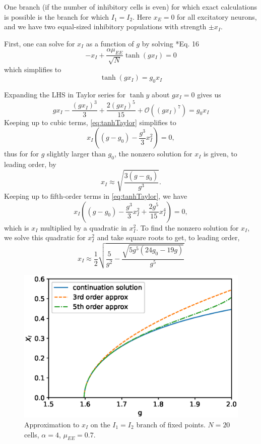 \documentclass[11pt,reqno]{amsart}
\begin{document}
One branch (if the number of inhibitory cells is even) for which exact calculations is possible is the branch for which $I_1=I_2$. Here $x_E = 0$ for all excitatory neurons, and we have two equal-sized inhibitory populations with strength $\pm x_I$. 

First, one can solve for $x_I$ as a function of $g$ by solving \cite{Barreiro2017}*{Eq. 16}
\[
-x_I + \frac{\alpha \mu_{EE} }{\sqrt{N}} \tanh(g x_I) = 0
\]
which simplifies to
\[
\tanh(g x_I) = g_0 x_I
\]

Expanding the LHS in Taylor series for $\tanh y$ about $gx_I = 0$ gives us 
\begin{equation}\label{eq:tanhTaylor}
g x_I - \frac{(g x_I)^3}{3} + \frac{2(g x_I)^5}{15} + \mathcal{O}\left( (g x_I)^7 \right) = g_0 x_I
\end{equation}
Keeping up to cubic terms, \cref{eq:tanhTaylor} simplifies to
\[
x_I \left( (g - g_0) - \frac{g^3}{3} x_I^2 \right) = 0,
\]
thus for for $g$ slightly larger than $g_0$, the nonzero solution for $x_I$ is given, to leading order, by
\begin{equation}\label{eq:xIapprox}
x_I \approx \sqrt{ \frac{3(g - g_0) }{g^3}}.
\end{equation}
Keeping up to fifth-order terms in \cref{eq:tanhTaylor}, we have
\[
x_I \left( (g - g_0) - \frac{g^3}{3} x_I^2 + \frac{2 g^5}{15} x_I^4 \right) = 0,
\]
which is $x_I$ multiplied by a quadratic in $x_I^2$. To find the nonzero solution for $x_I$, we solve this quadratic for $x_I^2$ and take square roots to get, to leading order,
\begin{equation*}
x_I \approx \frac{1}{2} \sqrt{ \frac{5}{g^2} - \frac{\sqrt{ 5 g^5( 24 g_0 - 19 g) }}{g^5}}
\end{equation*}

\begin{figure}
    \centering
    \includegraphics{images/Xiapprox.eps}
    \caption{Approximation to $x_I$ on the $I_1=I_2$ branch of fixed points. $N = 20$ cells, $\alpha = 4$, $\mu_{EE} = 0.7$.}
\end{figure}
\end{document}
